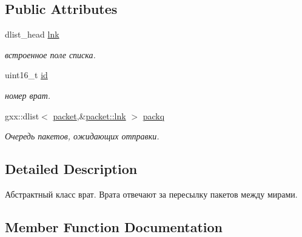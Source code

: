 \subsection*{Public Attributes}
\begin{DoxyCompactItemize}
\item 
dlist\+\_\+head \hyperlink{structg1_1_1gateway_a9b30f9f8c97681eb9b8ce01594200916}{lnk}\hypertarget{structg1_1_1gateway_a9b30f9f8c97681eb9b8ce01594200916}{}\label{structg1_1_1gateway_a9b30f9f8c97681eb9b8ce01594200916}

\begin{DoxyCompactList}\small\item\em встроенное поле списка. \end{DoxyCompactList}\item 
uint16\+\_\+t \hyperlink{structg1_1_1gateway_a9bc58cdaebf54c916deb87c4c44c0a59}{id}\hypertarget{structg1_1_1gateway_a9bc58cdaebf54c916deb87c4c44c0a59}{}\label{structg1_1_1gateway_a9bc58cdaebf54c916deb87c4c44c0a59}

\begin{DoxyCompactList}\small\item\em номер врат. \end{DoxyCompactList}\item 
gxx\+::dlist$<$ \hyperlink{structg1_1_1packet}{packet},\&\hyperlink{structg1_1_1packet_ad385dbb95d429aa9616059bd374b359b}{packet\+::lnk} $>$ \hyperlink{structg1_1_1gateway_af6c41db1fccaf674f06a8c0893238c1d}{packq}\hypertarget{structg1_1_1gateway_af6c41db1fccaf674f06a8c0893238c1d}{}\label{structg1_1_1gateway_af6c41db1fccaf674f06a8c0893238c1d}

\begin{DoxyCompactList}\small\item\em Очередь пакетов, ожидающих отправки. \end{DoxyCompactList}\end{DoxyCompactItemize}


\subsection{Detailed Description}
Абстрактный класс врат. Врата отвечают за пересылку пакетов между мирами. 

\subsection{Member Function Documentation}
